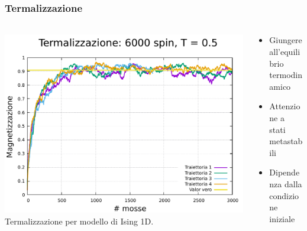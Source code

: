 \begin{frame}
    \frametitle{Termalizzazione}
    \framesubtitle{}

    \begin{columns}

        \begin{column}{0.6\textwidth}

            \centering
            \includegraphics[width=\textwidth]{Immagini/metodiNumerici/term_6000_0.5.pdf}
            \newline
            {\scriptsize Termalizzazione per modello di Ising 1D.}

        \end{column}


        \begin{column}{0.4\textwidth}
            
            \begin{itemize}[itemsep=0.5em, label=$\diamond$]
                \item Giungere all'equilibrio termodinamico
                \item Attenzione a stati metastabili
                \item Dipendenza dalla condizione iniziale
            \end{itemize}
            
        \end{column}
      \end{columns}
  
\end{frame}



